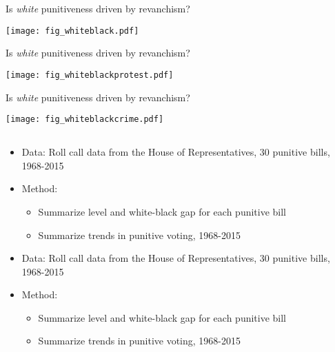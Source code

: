 \documentclass{beamer}
\begin{document}
\begin{frame}{Is \textit{white} punitiveness driven by revanchism?} 
\begin{center}
    \texttt{[image: fig\_whiteblack.pdf]}
\end{center}
\end{frame}

\begin{frame}{Is \textit{white} punitiveness driven by revanchism?} 
\begin{center}
    \texttt{[image: fig\_whiteblackprotest.pdf]}
\end{center}
\end{frame}

\begin{frame}{Is \textit{white} punitiveness driven by revanchism?} 
\begin{center}
    \texttt{[image: fig\_whiteblackcrime.pdf]}
\end{center}
\end{frame}

\begin{frame}{}
\begin{center}
    {\Large \claimfourq}
\end{center}
\end{frame}

\subsection{\claimfourq}
\begin{frame}{\claimfourq}
\begin{itemize}[<+->]
    \item[] \alert{Data:} Roll call data from the House of Representatives, 30 punitive bills, 1968-2015
    \item[] \alert{Method:} 
    \begin{itemize}
        \item Summarize level and white-black gap for each punitive bill
        \item Summarize trends in punitive voting, 1968-2015
    \end{itemize}
\end{itemize}
\end{frame}

\begin{frame}{\claimfourq}
\begin{itemize}
    \item[] \alert{Data:} Roll call data from the House of Representatives, 30 punitive bills, 1968-2015
    \item[] \alert{Method:} 
    \begin{itemize}
        \item Summarize level and white-black gap for each punitive bill
        \item \alert{Summarize trends in punitive voting, 1968-2015}
    \end{itemize}
\end{itemize}
\end{frame}
\end{document}
